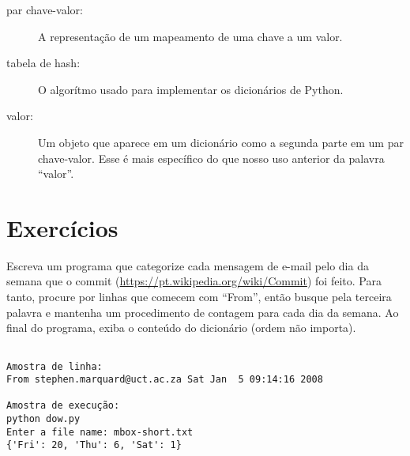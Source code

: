 \begin{description}
\item[par chave-valor:] A representação de um mapeamento de uma chave a um valor.

\item[tabela de hash:] O algorítmo usado para implementar os dicionários de Python.

\item[valor:] Um objeto que aparece em um dicionário como a segunda parte em um par chave-valor. Esse é mais específico do que nosso uso anterior da palavra ``valor''.

\end{description}

\section{Exercícios}

\begin{ex}

Escreva um programa que categorize cada mensagem de e-mail pelo dia da semana que o commit (\url{https://pt.wikipedia.org/wiki/Commit}) foi feito. Para tanto, procure por linhas que comecem com ``From'', então busque pela terceira palavra e mantenha um procedimento de contagem para cada dia da semana. Ao final do programa, exiba o conteúdo do dicionário (ordem não importa).

\beforeverb
\begin{verbatim}

Amostra de linha:
From stephen.marquard@uct.ac.za Sat Jan  5 09:14:16 2008

Amostra de execução:
python dow.py
Enter a file name: mbox-short.txt
{'Fri': 20, 'Thu': 6, 'Sat': 1}
\end{verbatim}
\afterverb
%
%
\end{ex}

